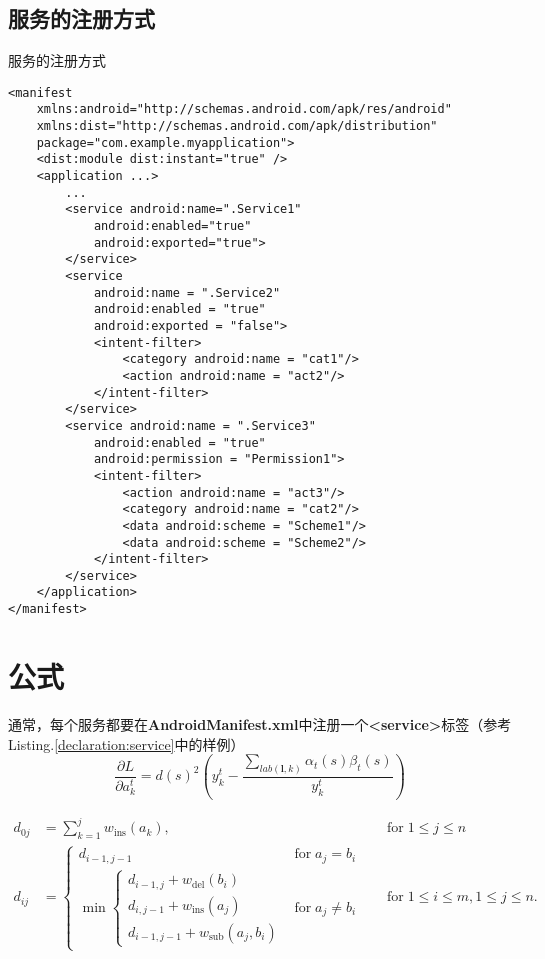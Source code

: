 \documentclass[winfonts]{njuthesis}
\begin{document}
\subsection{服务的注册方式}
\begin{listing}[htbp]
	\centering
	\caption{服务的注册方式}
	\begin{verbatim}
<manifest
    xmlns:android="http://schemas.android.com/apk/res/android"
    xmlns:dist="http://schemas.android.com/apk/distribution"
    package="com.example.myapplication">
    <dist:module dist:instant="true" />
    <application ...>
        ...
        <service android:name=".Service1"
            android:enabled="true"
            android:exported="true">
        </service>
        <service
            android:name = ".Service2"
            android:enabled = "true"
            android:exported = "false">
            <intent-filter>
                <category android:name = "cat1"/>
                <action android:name = "act2"/>
            </intent-filter>
        </service>
        <service android:name = ".Service3"
            android:enabled = "true"
            android:permission = "Permission1">
            <intent-filter>
                <action android:name = "act3"/>
                <category android:name = "cat2"/>
                <data android:scheme = "Scheme1"/>
                <data android:scheme = "Scheme2"/>
            </intent-filter>
        </service>
    </application>
</manifest>
	\end{verbatim}
	\label{declaration:service}
\end{listing}
\section{公式}
通常，每个服务都要在\textbf{AndroidManifest.xml}中注册一个\textbf{<service>}标签（参考Listing.\textcolor{red}{\ref{declaration:service}}中的样例）
\begin{equation}
\frac{\partial L}{\partial a_{k}^t} = {d(s)}^2 (y_{k}^t - \frac{\sum_{lab(\mathbf{l},k)} \alpha_t(s)\beta_t(s) }{y_{k}^t} )
\end{equation}

\begin{equation}
\begin{aligned}
d_{{0j}}&=\sum _{{k=1}}^{{j}}w_{{\mathrm  {ins}}}(a_{{k}}),\quad &{\text{for}}\;1\leq j\leq n\\
d_{{ij}}&={\begin{cases}d_{{i-1,j-1}}&{\text{for}}\;a_{{j}}=b_{{i}}\\\min {\begin{cases}d_{{i-1,j}}+w_{{\mathrm  {del}}}(b_{{i}})\\d_{{i,j-1}}+w_{{\mathrm  {ins}}}(a_{{j}})\\d_{{i-1,j-1}}+w_{{\mathrm  {sub}}}(a_{{j}},b_{{i}})\end{cases}}&{\text{for}}\;a_{{j}}\neq b_{{i}}\end{cases}}\quad &{\text{for}}\;1\leq i\leq m,1\leq j\leq n.
\end{aligned}
\end{equation}
\end{document}
